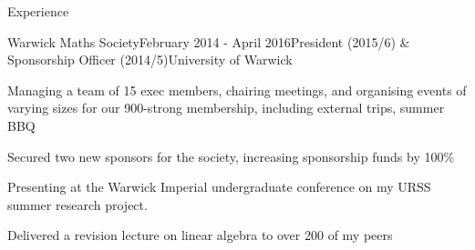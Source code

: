 \documentclass{resume} %
\begin{document}
\begin{rSection}{Experience}
\begin{rSubsection}{Warwick Maths Society}{February 2014 - April 2016}{President (2015/6) \& Sponsorship Officer (2014/5)}{University of Warwick}
\item Managing a team of 15 exec members, chairing meetings, and organising events of varying sizes for our 900-strong membership, including external trips, summer BBQ
\item Secured two new sponsors for the society, increasing sponsorship funds by 100\%
\item Presenting at the Warwick Imperial undergraduate conference on my URSS summer research project.
\item Delivered a revision lecture on linear algebra to over 200 of my peers
\end{rSubsection}

\end{rSection}

\end{document}
